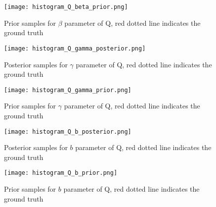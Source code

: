 \begin{figure}[h]
\vspace{.3in}
\centerline{\texttt{[image: histogram\_Q\_beta\_prior.png]}}
\vspace{.3in}
\caption{Prior samples for $\beta$ parameter of Q, red dotted line indicates the ground truth}
\label{fig:betaprior}
\end{figure}

\begin{figure}[h]
\vspace{.3in}
\centerline{\texttt{[image: histogram\_Q\_gamma\_posterior.png]}}
\vspace{.3in}
\caption{Posterior samples for $\gamma$ parameter of Q, red dotted line indicates the ground truth}
\label{fig:gamma}
\end{figure}

\begin{figure}[h]
\vspace{.3in}
\centerline{\texttt{[image: histogram\_Q\_gamma\_prior.png]}}
\vspace{.3in}
\caption{Prior samples for $\gamma$ parameter of Q, red dotted line indicates the ground truth}
\label{fig:gammaprior}
\end{figure}


\begin{figure}[h]
\vspace{.3in}
\centerline{\texttt{[image: histogram\_Q\_b\_posterior.png]}}
\vspace{.3in}
\caption{Posterior samples for $b$ parameter of Q, red dotted line indicates the ground truth}
\label{fig:b}
\end{figure}

\begin{figure}[h]
\vspace{.3in}
\centerline{\texttt{[image: histogram\_Q\_b\_prior.png]}}
\vspace{.3in}
\caption{Prior samples for $b$ parameter of Q, red dotted line indicates the ground truth}
\label{fig:bprior}
\end{figure}

%
%
